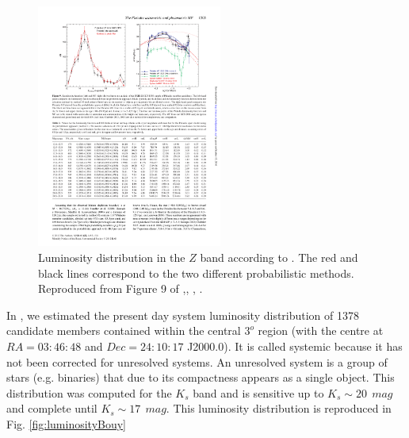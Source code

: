 \begin{figure}[ht!]
\begin{center}
\includegraphics[height=8cm]{background/Figures/F9_Lodieu2012.pdf}
\caption{Luminosity distribution  in the $Z$ band according to \citet{Lodieu2012}. The red and black lines correspond to the two different probabilistic methods.  Reproduced from Figure 9 of \citet{Lodieu2012},\textit{}, , .}
\label{fig:luminosityLodieu}
\end{center}
\end{figure}

In \citet{Bouy2015},  we estimated the present day system luminosity distribution of 1378 candidate members contained within the central $3^o$ region (with the centre at $RA=03:46:48$ and $Dec=24:10:17$ J2000.0). It is called systemic because it has not been corrected for unresolved systems. An unresolved system is a group of stars (e.g. binaries) that due to its compactness appears as a single object. This distribution was computed for the $K_s$ band and is sensitive up to $K_s \sim 20 \ \ mag$ and complete until $K_s \sim 17\ \ mag$. This luminosity distribution is reproduced in Fig. \ref{fig:luminosityBouy}


